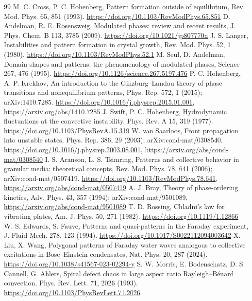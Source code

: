 \documentclass[11pt]{article}
\begin{document}
\begin{thebibliography}{99}
\setlength{\itemsep}{0pt plus 0.5pt}
 M. C. Cross, P. C. Hohenberg, Pattern formation outside of equilibrium, Rev. Mod. Phys. 65, 851 (1993). \url{https://doi.org/10.1103/RevModPhys.65.851}
 D. Andelman, R. E. Rosensweig, Modulated phases: review and recent results, J. Phys. Chem. B 113, 3785 (2009). \url{https://doi.org/10.1021/jp807770n}
 J. S. Langer, Instabilities and pattern formation in crystal growth, Rev. Mod. Phys. 52, 1 (1980). \url{https://doi.org/10.1103/RevModPhys.52.1}
 M. Seul, D. Andelman, Domain shapes and patterns: the phenomenology of modulated phases, Science 267, 476 (1995). \url{https://doi.org/10.1126/science.267.5197.476}
 P. C. Hohenberg, A. P. Krekhov, An introduction to the Ginzburg–Landau theory of phase transitions and nonequilibrium patterns, Phys. Rep. 572, 1 (2015); arXiv:1410.7285. \url{https://doi.org/10.1016/j.physrep.2015.01.001}, \url{https://arxiv.org/abs/1410.7285}
 J. Swift, P. C. Hohenberg, Hydrodynamic fluctuations at the convective instability, Phys. Rev. A 15, 319 (1977). \url{https://doi.org/10.1103/PhysRevA.15.319}
 W. van Saarloos, Front propagation into unstable states, Phys. Rep. 386, 29 (2003); arXiv:cond-mat/0308540. \url{https://doi.org/10.1016/j.physrep.2003.08.001}, \url{https://arxiv.org/abs/cond-mat/0308540}
 I. S. Aranson, L. S. Tsimring, Patterns and collective behavior in granular media: theoretical concepts, Rev. Mod. Phys. 78, 641 (2006); arXiv:cond-mat/0507419. \url{https://doi.org/10.1103/RevModPhys.78.641}, \url{https://arxiv.org/abs/cond-mat/0507419}
 A. J. Bray, Theory of phase-ordering kinetics, Adv. Phys. 43, 357 (1994); arXiv:cond-mat/9501089. \url{https://arxiv.org/abs/cond-mat/9501089}
 T. D. Rossing, Chladni's law for vibrating plates, Am. J. Phys. 50, 271 (1982). \url{https://doi.org/10.1119/1.12866}
 W. S. Edwards, S. Fauve, Patterns and quasi-patterns in the Faraday experiment, J. Fluid Mech. 278, 123 (1994). \url{https://doi.org/10.1017/S0022112094003642}
 X. Liu, X. Wang, Polygonal patterns of Faraday water waves analogous to collective excitations in Bose–Einstein condensates, Nat. Phys. 20, 287 (2024). \url{https://doi.org/10.1038/s41567-023-02294-y}
 S. W. Morris, E. Bodenschatz, D. S. Cannell, G. Ahlers, Spiral defect chaos in large aspect ratio Rayleigh–Bénard convection, Phys. Rev. Lett. 71, 2026 (1993). \url{https://doi.org/10.1103/PhysRevLett.71.2026}

\end{thebibliography}
\end{document}
